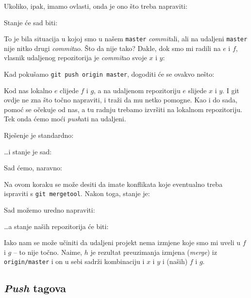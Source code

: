 Ukoliko, ipak, imamo ovlasti, onda je ono što treba napraviti:



Stanje će sad biti:



To je bila situacija u kojoj smo u našem \verb+master+ \emph{commit}ali, ali na udaljeni \verb+master+ nije nitko drugi \emph{commit}ao.
Što da nije tako?
Dakle, dok smo mi radili na $e$ i $f$, vlasnik udaljenog repozitorija je \emph{commit}ao svoje $x$ i $y$:



Kad pokušamo \verb+git push origin master+, dogoditi će se ovakvo nešto:



Kod nas lokalno $e$ clijede $f$ i $g$, a na udaljenom repozitoriju $e$ slijede $x$ i $y$. 
I git ovdje ne zna što točno napraviti, i traži da mu netko pomogne.
Kao i do sada, pomoć se očekuje od nas, a tu radnju trebamo izvršiti na lokalnom repozitoriju.
Tek onda ćemo moći \emph{push}ati na udaljeni.

Rješenje je standardno:


\dots{}i stanje je sad:



Sad ćemo, naravno:


Na ovom koraku se može desiti da imate konflikata koje eventualno treba ispraviti s \verb+git mergetool+.
Nakon toga, stanje je:



Sad možemo uredno napraviti:


\dots{}a stanje naših repozitorija će biti:



Iako nam se može učiniti da udaljeni projekt nema izmjene koje smo mi uveli u $f$ i $g$ -- to nije točno.
Naime, $h$ je rezultat preuzimanja izmjena (\emph{merge}) iz \verb+origin/master+ i on u sebi sadrži kombinaciju i $x$ i $y$ i (naših) $f$ i $g$.

\subsection*{\emph{Push} tagova}

